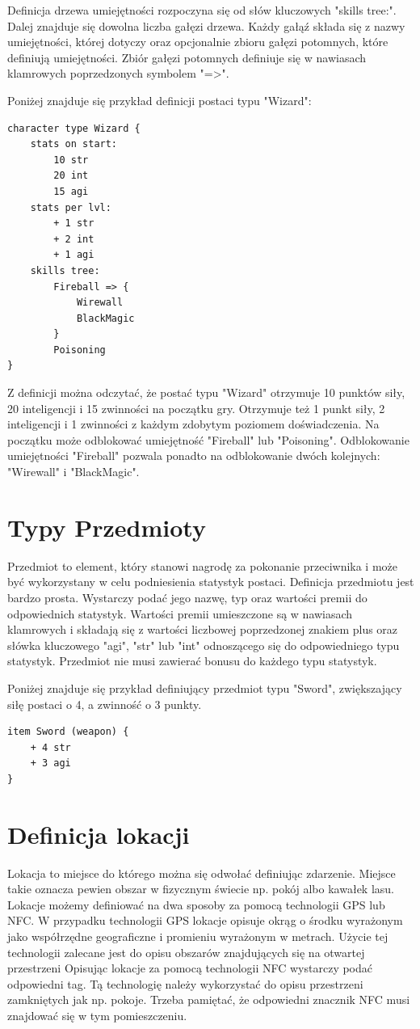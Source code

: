 \documentclass	{xmgr}
\begin{document}
Definicja drzewa umiejętności rozpoczyna się od słów kluczowych "skills tree:". Dalej znajduje się dowolna liczba gałęzi drzewa.
Każdy gałąź składa się z nazwy umiejętności, której dotyczy oraz opcjonalnie zbioru gałęzi potomnych, które definiują umiejętności.
Zbiór gałęzi potomnych definiuje się w nawiasach klamrowych poprzedzonych symbolem "=>". 

Poniżej znajduje się przykład definicji postaci typu "Wizard":
\begin{lstlisting}
character type Wizard {
	stats on start:
		10 str
		20 int
		15 agi
	stats per lvl:
		+ 1 str
		+ 2 int
		+ 1 agi
	skills tree:
		Fireball => {
			Wirewall
			BlackMagic
		}
		Poisoning
}
\end{lstlisting}
Z definicji można odczytać, że postać typu "Wizard" otrzymuje 10 punktów siły, 20 inteligencji i 15 zwinności na początku gry.
Otrzymuje też 1 punkt siły, 2 inteligencji i 1 zwinności z każdym zdobytym poziomem doświadczenia.
Na początku może odblokować umiejętność "Fireball" lub "Poisoning". Odblokowanie umiejętności "Fireball" pozwala ponadto na odblokowanie dwóch kolejnych: "Wirewall" i "BlackMagic". 

\section{Typy Przedmioty}
Przedmiot to element, który stanowi nagrodę za pokonanie przeciwnika i może być wykorzystany w celu podniesienia statystyk postaci. 
Definicja przedmiotu jest bardzo prosta. Wystarczy podać jego nazwę, typ oraz wartości premii do odpowiednich statystyk.
Wartości premii umieszczone są w nawiasach klamrowych i składają się z wartości liczbowej poprzedzonej znakiem plus oraz słówka kluczowego "agi", "str" lub "int" odnoszącego się do odpowiedniego typu statystyk. Przedmiot nie musi zawierać bonusu do każdego typu statystyk.

Poniżej znajduje się przykład definiujący przedmiot typu "Sword", zwiększający siłę postaci o 4, a zwinność o 3 punkty.
\begin{lstlisting}
item Sword (weapon) {
	+ 4 str
	+ 3 agi
}
\end{lstlisting}

\section{Definicja lokacji}
Lokacja to miejsce do którego można się odwołać definiując zdarzenie. Miejsce takie oznacza pewien obszar w fizycznym świecie np. pokój albo kawałek lasu. Lokacje możemy definiować na dwa sposoby za pomocą technologii GPS lub NFC. 
W przypadku technologii GPS lokacje opisuje okrąg o środku wyrażonym jako współrzędne geograficzne i promieniu wyrażonym w metrach. Użycie tej technologii zalecane jest do opisu obszarów znajdujących się na otwartej przestrzeni 
Opisując lokacje za pomocą technologii NFC wystarczy podać odpowiedni tag. Tą technologię należy wykorzystać do opisu przestrzeni zamkniętych jak np. pokoje. Trzeba pamiętać, że odpowiedni znacznik NFC musi znajdować się w tym pomieszczeniu.
\end{document}
